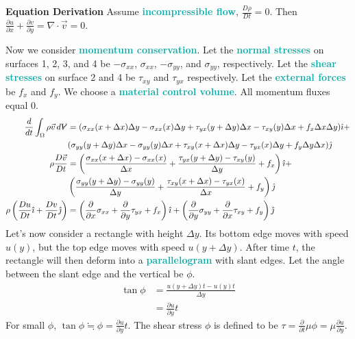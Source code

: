 \documentclass[twoside]{article}
\makeatletter
\DeclareRobustCommand{\vol}{\text{\volumedash}V}
\newcommand{\volumedash}{%
	\makebox[0pt][l]{%
		\ooalign{\hfil\hphantom{$\m@th V$}\hfil\cr\kern0.16em\rotatebox{27.5}{\textbf{--}}\hfil\cr}%
	}%
}
\newcommand{\derivation}[1]{\begin{derivationbox} \emoji{pineapple} \textbf{Equation Derivation} \newline #1 \end{derivationbox}}
\newcommand{\highlightbluetext}[1]{\textcolor[HTML]{09ACA6}{\textbf{#1}}}
\numberwithin{equation}{section}
\makeatother
\begin{document}
	\derivation{
		Assume \highlightbluetext{incompressible flow}, $\frac{D\rho}{Dt} = 0$. Then $\frac{\partial u}{\partial x}+\frac{\partial v}{\partial y} = \nabla \cdot \vec{v} = 0$.
		
		Now we consider \highlightbluetext{momentum conservation}. Let the \highlightbluetext{normal stresses} on surfaces 1, 2, 3, and 4 be $-\sigma_{xx}$, $\sigma_{xx}$, $-\sigma_{yy}$, and $\sigma_{yy}$, respectively. Let the \highlightbluetext{shear stresses} on surface 2 and 4 be $\tau_{xy}$ and $\tau_{yx}$ respectively. Let the \highlightbluetext{external forces} be $f_x$ and $f_y$. We choose a \highlightbluetext{material control volume}. All momentum fluxes equal 0.
		\begin{align*}
			\frac{d}{dt} \int_\Omega \rho \vec{v} \, d\vol &= (\sigma_{xx}(x+\Delta x)\Delta y-\sigma_{xx}(x)\Delta y+\tau_{yx}(y+\Delta y)\Delta x-\tau_{xy}(y)\Delta x+f_x \Delta x \Delta y) \hat{\imath}+ \\
			&(\sigma_{yy}(y+\Delta y)\Delta x-\sigma_{yy}(y)\Delta x+\tau_{xy}(x+\Delta x)\Delta y-\tau_{yx}(x)\Delta y+f_y \Delta y \Delta x) \hat{\jmath} \\
			\rho \frac{D\vec{v}}{Dt} &= \left( \frac{\sigma_{xx}(x+\Delta x)-\sigma_{xx}(x)}{\Delta x}+\frac{\tau_{yx}(y+\Delta y)-\tau_{xy}(y)}{\Delta y}+f_x \right) \hat{\imath}+ \\
			&\left( \frac{\sigma_{yy}(y+\Delta y)-\sigma_{yy}(y)}{\Delta y}+\frac{\tau_{xy}(x+\Delta x)-\tau_{yx}(x)}{\Delta x}+f_y \right) \hat{\jmath} \\
			\rho \left( \frac{Du}{Dt} \hat{\imath}+\frac{Dv}{Dt} \hat{\jmath} \right) &= \left( \frac{\partial}{\partial x} \sigma_{xx}+\frac{\partial}{\partial y} \tau_{yx}+f_x \right) \hat{\imath}+\left( \frac{\partial}{\partial y} \sigma_{yy}+\frac{\partial}{\partial x} \tau_{xy}+f_y \right) \hat{\jmath}
		\end{align*}
		Let's now consider a rectangle with height $\Delta y$. Its bottom edge moves with speed $u(y)$, but the top edge moves with speed $u(y+\Delta y)$. After time $t$, the rectangle will then deform into a \highlightbluetext{parallelogram} with slant edges. Let the angle between the slant edge and the vertical be $\phi$.
		\begin{align*}
			\tan \phi &= \frac{u(y+\Delta y)t-u(y)t}{\Delta y} \\
			          &= \frac{\partial u}{\partial y} t
		\end{align*}
		For small $\phi$, $\tan \phi \fallingdotseq \phi = \frac{\partial u}{\partial y} t$. The shear stress $\phi$ is defined to be $\tau = \frac{\partial}{\partial t} \mu \phi = \mu \frac{\partial u}{\partial y}$.
		
}
\end{document}
